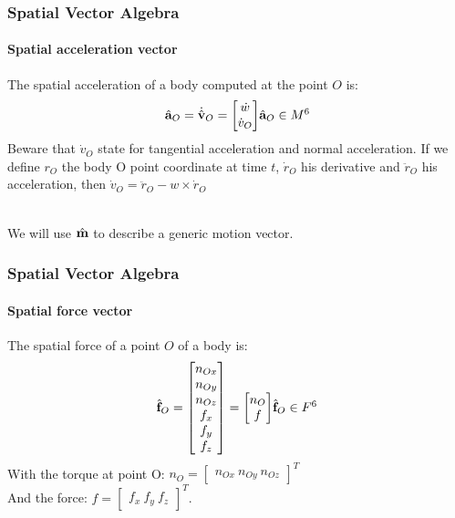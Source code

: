 \documentclass{beamer}
\begin{document}
  	\begin{frame}
		\frametitle{Spatial Vector Algebra}
		\framesubtitle{Spatial acceleration vector}
		The spatial acceleration of a body computed at the point $ O $ is:
		\begin{subequations}
			$$
			\accelvecHatOrigin{O} = \velocityvecDotHatOrigin{O} = \begin{bmatrix} \dot{w} \\ \dot{v}_O \end{bmatrix}
			$$
			$$
			\accelvecHatOrigin{O} \in \motionspace{6}
			$$
		\end{subequations}
		Beware that $ \dot{v}_O $ state for tangential acceleration and normal acceleration.
		If we define $ r_O $ the body O point coordinate at time $ t $, $ \dot{r}_O $ his derivative and $ \ddot{r}_O $ his acceleration, then $ \dot{v}_O = \ddot{r}_O - w \times \dot{r}_O $ 

		\hfill \\
		We will use $ \hat{\mathbf{m}} $ to describe a generic motion vector.
	\end{frame}


  	\begin{frame}
		\frametitle{Spatial Vector Algebra}
		\framesubtitle{Spatial force vector}
		The spatial force of a point $ O $ of a body is:
		\begin{subequations}
			$$
			\forcevecHatOrigin{O} = \begin{bmatrix} n_{Ox} \\ n_{Oy} \\ n_{Oz} \\ f_x \\ f_y \\ f_z \end{bmatrix} = \begin{bmatrix} n_O \\ f \end{bmatrix}
			$$
			$$
			\forcevecHatOrigin{O} \in \forcespace{6}
			$$
		\end{subequations}
		With the torque at point O:
		$ n_O = \begin{bmatrix} n_{Ox}\ n_{Oy}\ n_{Oz} \end{bmatrix}^T $\\
	        And the force:	
		$ f = \begin{bmatrix} f_x\ f_y\ f_z \end{bmatrix}^T $.
	\end{frame}
\end{document}

